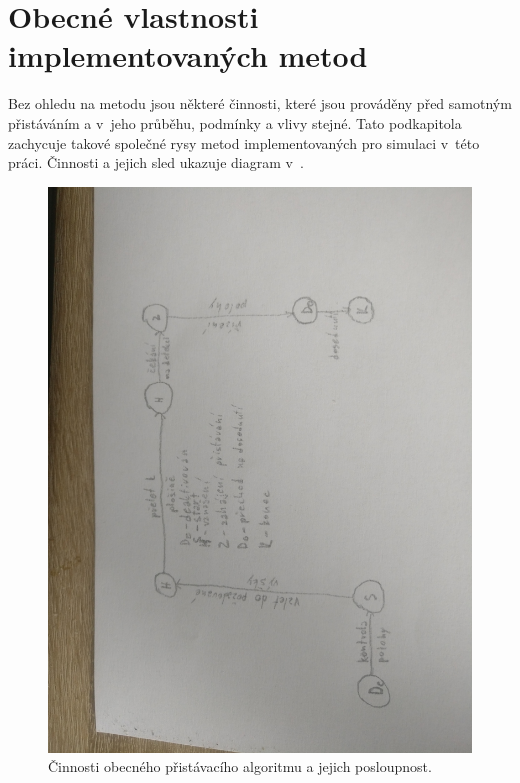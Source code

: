     \section{Obecné vlastnosti implementovaných metod} \label{sec:generalalg}
    Bez ohledu na metodu jsou některé činnosti, které jsou prováděny před samotným přistáváním a v~jeho průběhu, podmínky a vlivy stejné. Tato podkapitola zachycuje takové společné rysy metod implementovaných pro simulaci v~této práci. Činnosti a jejich sled ukazuje diagram v~.
    \begin{figure}
        \centering
        \includegraphics[height=\textwidth,angle=-90,origin=c]{img/algs/genAlg.jpg}
        \caption[Činnosti obecného přistávacího algoritmu]{Činnosti obecného přistávacího algoritmu a jejich posloupnost.} %
        \label{fig:algObecny}
    \end{figure}
    
